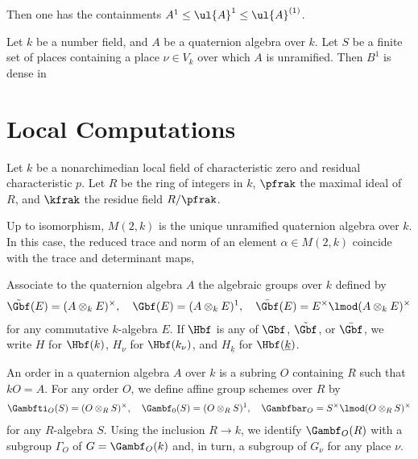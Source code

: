 Then one has the containments $A^1 \leq  \ul{A}^1 \leq \ul{A}^{(1)}$.


\begin{proposition}
    Let $k$ be a number field, and $A$ be a quaternion algebra over $k$. Let $S$ be a finite set of places containing a place $\nu \in V_k$ over which $A$ is unramified. Then $B^1$ is dense in
\end{proposition}
\newpage
\section{Local Computations}

Let $k$ be a nonarchimedian local field of characteristic zero and residual characteristic $p$. Let $R$ be the ring of integers in $k$,   $\pfrak$ the maximal ideal of $R$, and $\kfrak$ the residue field $R/\pfrak$.

Up to isomorphism, $M(2,k)$ is the unique unramified quaternion algebra over $k$.  In this case, the reduced trace and norm of an element $\alpha \in M(2,k)$ coincide with the trace and determinant maps,


\newpage



Associate to the quaternion algebra $A$ the algebraic groups over $k$ defined by
\begin{align*}
    \tilde{\Gbf}(E) = (A\otimes_k E)^\times,\quad \Gbf (E) = (A\otimes_k E)^1,\quad  \bar{\Gbf}(E) = E^\times \lmod (A\otimes_k E)^\times
\end{align*}
for any commutative $k$-algebra $E$. If $\Hbf$ is any of $\Gbf$, $\tilde{\Gbf}$, or $\bar{\Gbf}$, we write $H$ for $\Hbf(k)$, $H_\nu$ for $\Hbf(k_\nu)$, and $H_{\underline{k}}$ for $\Hbf(\underline{k})$.

An order in a quaternion algebra $A$ over $k$ is a subring $O$ containing $R$ such that $kO = A$. For any order $O$, we define affine group schemes over $R$ by
\begin{align*}
    \Gambfti_O(S) = (O\otimes_R S)^\times, \quad \Gambf_0(S) = (O\otimes_R S)^1, \quad \Gambfbar_O = S^\times \lmod (O\otimes_R S)^\times
\end{align*}
for any $R$-algebra $S$. Using the inclusion $R \to k$, we identify $\Gambf_O(R)$ with a subgroup $\Gamma_O$ of $G=\Gambf_O(k)$ and, in turn, a subgroup of $G_\nu$ for any place $\nu$.





